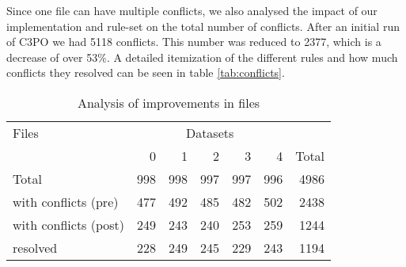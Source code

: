 \documentclass[a4paper,12pt]{article}
\begin{document}
Since one file can have multiple conflicts, we also analysed the impact of our implementation and rule-set on the total number of conflicts.
After an initial run of C3PO we had 5118 conflicts. This number was reduced to 2377, which is a decrease of over 53\%.
A detailed itemization of the different rules and how much conflicts they resolved can be seen in table \ref{tab:conflicts}.

\begin{table}[ht]
\begin{center}

\begin{tabular}[h]{l||r|r|r|r|r||r}
Files &  \multicolumn{5}{c}{Datasets} \\
        & 0 & 1 & 2 & 3 & 4 & Total \\
\hline
Total & 998 & 998 & 997 & 997 & 996 & 4986\\ 
\hline
with conflicts (pre) & 477 &	492 & 485 & 482	& 502 &	2438\\ 
with conflicts (post) & 249	& 243 &	240 & 253 &	259 & 1244\\
\hline
resolved & 228 & 249 & 245 & 229 & 243 & 1194

\end{tabular}
\end{center}
\caption{Analysis of improvements in files}
\label{tab:files}
\end{table}
\end{document}

